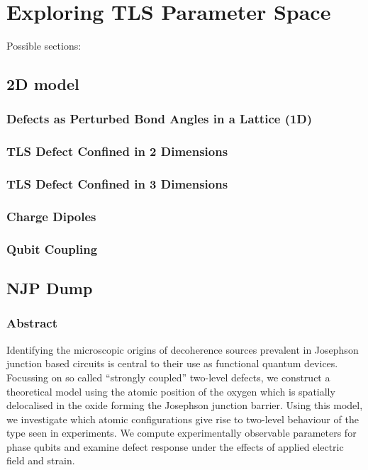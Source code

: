 \versoimage
\chapter{Exploring TLS Parameter Space}\label{ch:implementation}

Possible sections:

\section{2D model}\label{sec:2d}
\subsection{Defects as Perturbed Bond Angles in a Lattice (1D)}
\subsection{TLS Defect Confined in 2 Dimensions}
\subsection{TLS Defect Confined in 3 Dimensions}
\subsection{Charge Dipoles}
\subsection{Qubit Coupling}

\section{NJP Dump}
\subsection{Abstract}
Identifying the microscopic origins of decoherence sources prevalent in Josephson junction based circuits is central to their use as functional quantum devices.
Focussing on so called ``strongly coupled'' two-level defects, we construct a theoretical model using the atomic position of the oxygen which is spatially delocalised in the oxide forming the Josephson junction barrier.
Using this model, we investigate which atomic configurations give rise to two-level behaviour of the type seen in experiments.
We compute experimentally observable parameters for phase qubits and examine defect response under the effects of applied electric field and strain.


